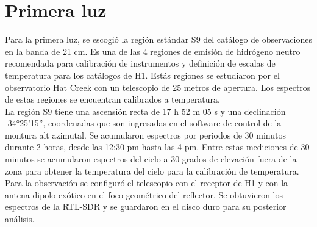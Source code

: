 \section{Primera luz}

Para la primera luz, se escogió la región estándar S9 del catálogo de observaciones en la banda de 21 cm. Es una de las 4 regiones de emisión de hidrógeno neutro recomendada para calibración de instrumentos y definición de escalas de temperatura para los catálogos de H1. Estás regiones se estudiaron por el observatorio Hat Creek con un telescopio de 25 metros de apertura. Los espectros de estas regiones se encuentran calibrados a temperatura.\\

La región S9 tiene una ascensión recta de 17 h 52 m 05 s y una declinación -34°25'15'', coordenadas que son ingresadas en el software de control de la montura alt azimutal. Se acumularon espectros por periodos de 30 minutos durante 2 horas, desde las 12:30 pm hasta las 4 pm. Entre estas mediciones de 30 minutos se acumularon espectros del cielo a 30 grados de elevación fuera de la zona para obtener la temperatura del cielo para la calibración de temperatura.\\

Para la observación se configuró el telescopio con el receptor de H1 y con la antena dipolo exótico en el foco geométrico del reflector. Se obtuvieron los espectros de la RTL-SDR y se guardaron en el disco duro para su posterior análisis.\\